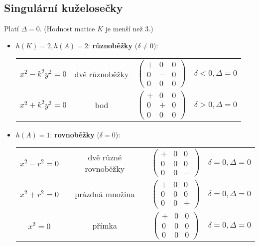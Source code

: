 \subsection{Singulární kuželosečky}
Platí $\Delta = 0.$ (Hodnost matice $K$ je menší než 3.)

\begin{itemize}
\item $h(K)=2, h(A)=2$: \textbf{různoběžky} ($\delta \ne 0$):
\begin{center}
    \begin{tabular}{c c c c}
        $x^2-k^2y^2=0$ & dvě různoběžky & $\begin{pmatrix}
            + & 0 & 0 \\
            0 & - & 0 \\
            0 & 0 & 0
        \end{pmatrix}$ & $\delta <0, \Delta =0$ \\[1cm]
        $x^2+k^2y^2=0$ & bod & $\begin{pmatrix}
            + & 0 & 0 \\
            0 & + & 0 \\
            0 & 0 & 0
        \end{pmatrix}$ & $\delta >0, \Delta =0$
    \end{tabular}
\end{center}
\item $h(A)=1$: \textbf{rovnoběžky} ($\delta = 0$):
\begin{center}
    \begin{tabular}{c c c c}
        $x^2-r^2 = 0$ & dvě různé rovnoběžky & $\begin{pmatrix}
            + & 0 & 0  \\
            0 & 0 & 0 \\
            0 & 0 & -
        \end{pmatrix}$ & $\delta =0, \Delta =0$ \\[1cm]
        $x^2+r^2 = 0$ & prázdná množina & $\begin{pmatrix}
            + & 0 & 0  \\
            0 & 0 & 0 \\
            0 & 0 & +
        \end{pmatrix}$ & $\delta =0, \Delta =0$ \\[1cm]
        $x^2 = 0$ & přímka & $\begin{pmatrix}
            + & 0 & 0  \\
            0 & 0 & 0 \\
            0 & 0 & 0
        \end{pmatrix}$ & $\delta =0, \Delta =0$
    \end{tabular}
\end{center}
\end{itemize}

